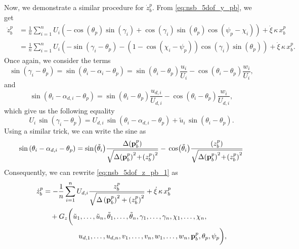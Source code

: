 Now, we demonstrate a similar procedure for $\dot{z}_b^p$.
From \eqref{eq:nsb_5dof_y_pb}, we get
\begin{equation}
    \begin{split}
        \dot{z}_b^p &= \frac{1}{n} \sum_{i=1}^n U_i \left(-\cos\left(\theta_p\right)\sin\left(\gamma_i\right) + \cos\left(\gamma_i\right)\sin(\theta_p)\cos\left(\psi_p-\chi_i\right)\right) + \dot{\xi}\,\kappa\,x_b^p \\
        &= \frac{1}{n} \sum_{i=1}^n U_i \left(-\sin\left(\gamma_i - \theta_p\right) - \left(1 - \cos\left(\chi_i - \psi_p\right)\right)\cos\left(\gamma_i\right)\sin(\theta_p)\right) + \dot{\xi}\,\kappa\,x_b^p. 
    \end{split} \label{eq:nsb_5dof_z_pb_1}
\end{equation}
Once again, we consider the terms
\begin{equation}
    \sin\left(\gamma_i - \theta_p\right) = \sin\left(\theta_i - \alpha_i - \theta_p\right) = \sin\left(\theta_i - \theta_p\right)\frac{u_i}{U_i} - \cos\left(\theta_i - \theta_p\right)\frac{w_i}{U_i},
\end{equation}
and
\begin{equation}
    \sin\left(\theta_i - \alpha_{d,i} - \theta_p\right) = \sin\left(\theta_i - \theta_p\right)\frac{u_{d,i}}{U_{d,i}} - \cos\left(\theta_i - \theta_p\right)\frac{w_i}{U_{d,i}},
\end{equation}
which give us the following equality
\begin{equation}
    U_i\,\sin\left(\gamma_i - \theta_p\right) = U_{d,i}\,\sin\left(\theta_i - \alpha_{d,i} - \theta_p\right) + \tilde{u}_i\,\sin\left(\theta_i - \theta_p\right).
\end{equation}
Using a similar trick, we can write the sine as
\begin{equation}
    \sin\left(\theta_i - \alpha_{d,i} - \theta_p\right) = \sin\!\left(\tilde{\theta}_i\right)\!\frac{\Delta\!\left(\mat{p}_b^p\right)}{\sqrt{\Delta\!\left(\mat{p}_b^p\right)^2\! +\! \left(z_b^p\right)^2}} -\, \cos\!\left(\tilde{\theta}_i\right)\!\frac{\left(z_b^p\right)}{\sqrt{\Delta\!\left(\mat{p}_b^p\right)^2 \!+\! \left(z_b^p\right)^2}}
\end{equation}
Consequently, we can rewrite \eqref{eq:nsb_5dof_z_pb_1} as
\begin{equation}
    \begin{split}
        \dot{z}_b^p &= - \frac{1}{n} \sum_{i=1}^n U_{d,i}\frac{z_b^p}{\sqrt{\Delta\left(\mathbf{p}_b^p\right)^2 + \left(z_b^p\right)^2}} + \dot{\xi}\,\kappa\,x_b^p \\
        & \quad + G_z\bigg(\tilde{u}_1, \ldots, \tilde{u}_n, \tilde{\theta}_1, \ldots, \tilde{\theta}_n, \gamma_1, \ldots, \gamma_n, \chi_1, \ldots, \chi_n, \\
        & \qquad \qquad \quad u_{d,1}, \ldots, u_{d,n}, v_1, \ldots, v_n, w_1, \ldots, w_n, \mathbf{p}_b^p, \theta_p, \psi_p\bigg),
    \end{split}
\end{equation}
